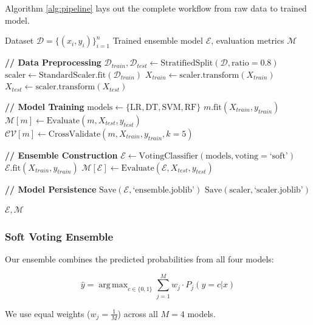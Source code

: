 \documentclass[12pt]{article}
\DeclareMathOperator*{\argmax}{arg\,max}
\begin{document}
Algorithm \ref{alg:pipeline} lays out the complete workflow from raw data to trained model.

\begin{algorithm}[H]
\caption{Breast Cancer Classification Pipeline}
\label{alg:pipeline}
\begin{algorithmic}[1]
\Require Dataset $\mathcal{D} = \{(x_i, y_i)\}_{i=1}^{n}$
\Ensure Trained ensemble model $\mathcal{E}$, evaluation metrics $\mathcal{M}$

\State \textbf{// Data Preprocessing}
\State $\mathcal{D}_{train}, \mathcal{D}_{test} \gets \text{StratifiedSplit}(\mathcal{D}, \text{ratio}=0.8)$
\State $\text{scaler} \gets \text{StandardScaler.fit}(\mathcal{D}_{train})$
\State $X_{train} \gets \text{scaler.transform}(X_{train})$
\State $X_{test} \gets \text{scaler.transform}(X_{test})$

\State \textbf{// Model Training}
\State $\text{models} \gets \{\text{LR}, \text{DT}, \text{SVM}, \text{RF}\}$
    \State $m.\text{fit}(X_{train}, y_{train})$
    \State $\mathcal{M}[m] \gets \text{Evaluate}(m, X_{test}, y_{test})$
    \State $\mathcal{CV}[m] \gets \text{CrossValidate}(m, X_{train}, y_{train}, k=5)$
\EndFor

\State \textbf{// Ensemble Construction}
\State $\mathcal{E} \gets \text{VotingClassifier}(\text{models}, \text{voting}=\text{`soft'})$
\State $\mathcal{E}.\text{fit}(X_{train}, y_{train})$
\State $\mathcal{M}[\mathcal{E}] \gets \text{Evaluate}(\mathcal{E}, X_{test}, y_{test})$

\State \textbf{// Model Persistence}
\State $\text{Save}(\mathcal{E}, \text{`ensemble.joblib'})$
\State $\text{Save}(\text{scaler}, \text{`scaler.joblib'})$

\State \Return $\mathcal{E}, \mathcal{M}$
\end{algorithmic}
\end{algorithm}

\subsubsection{Soft Voting Ensemble}

Our ensemble combines the predicted probabilities from all four models:

\begin{equation}
\hat{y} = \argmax_{c \in \{0,1\}} \sum_{j=1}^{M} w_j \cdot P_j(y=c|x)
\end{equation}

We use equal weights ($w_j = \frac{1}{M}$) across all $M=4$ models.
\end{document}

